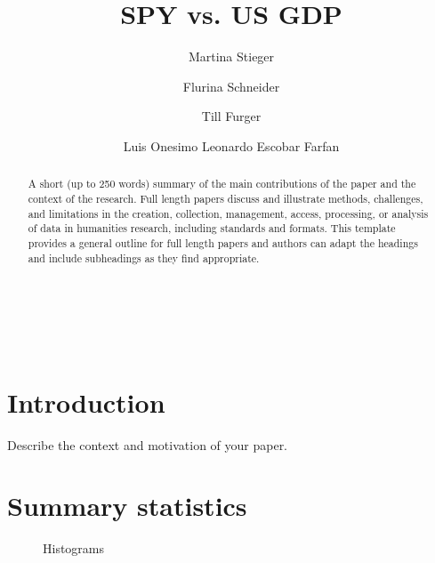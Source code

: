\documentclass[12pt,a4paper,english]{article}
\title{SPY vs. US GDP}
\author[1]{Martina Stieger}
\author[1]{Flurina Schneider}
\author[1]{Till Furger}
\author[1]{Luis Onesimo Leonardo Escobar Farfan}
\affil[1]{University of Zurich, Plattenstrasse 14, 8032 Zurich, Switzerland}
\begin{document}

\maketitle

\begin{abstract} 
\noindent A short (up to 250 words) summary of the main contributions of the paper and the context of the research. Full length papers discuss and illustrate methods, challenges, and limitations in the creation, collection, management, access, processing, or analysis of data in humanities research, including standards and formats. This template provides a general outline for full length papers and authors can adapt the headings and include subheadings as they find appropriate.
\end{abstract}

\hfill

\noindent{}\\
\noindent{}\\

\newpage


\tableofcontents

\section{Introduction}
Describe the context and motivation of your paper.

\section{Summary statistics}

\begin{figure}[htbp]
	\centering
	
	\caption{Histograms}
\end{figure}
\end{document}
